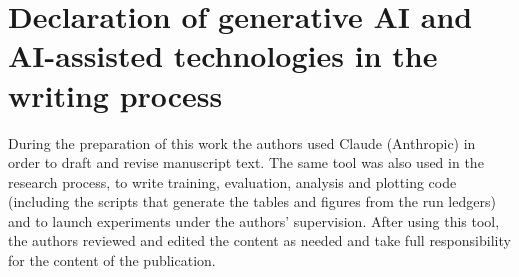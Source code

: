 \section*{Declaration of generative AI and AI-assisted technologies in the
writing process}
During the preparation of this work the authors used Claude (Anthropic) in
order to draft and revise manuscript text. The same tool was also used in the
research process, to write training, evaluation, analysis and plotting code
(including the scripts that generate the tables and figures from the run
ledgers) and to launch experiments under the authors' supervision. After using this tool, the
authors reviewed and edited the content as needed and take full responsibility
for the content of the publication.
